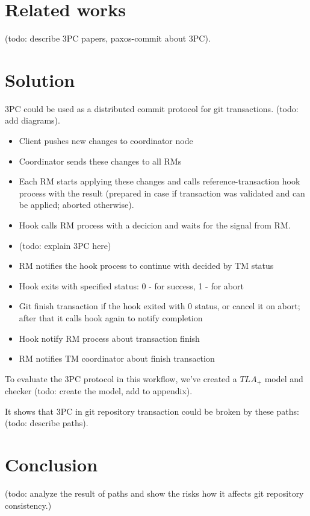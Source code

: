\documentclass[acmlarge, screen, nonacm]{acmart}
\begin{document}
\section{Related works}

(todo: describe 3PC papers, paxos-commit about 3PC).

\section{Solution}

3PC could be used as a distributed commit protocol for git transactions. (todo: add diagrams).
\begin{itemize}
  \item Client pushes new changes to coordinator node
  \item Coordinator sends these changes to all RMs
  \item Each RM starts applying these changes and calls reference-transaction hook process with the result (prepared
    in case if transaction was validated and can be applied; aborted otherwise).
  \item Hook calls RM process with a decicion and waits for the signal from RM.
  \item (todo: explain 3PC here)
  \item RM notifies the hook process to continue with decided by TM status
  \item Hook exits with specified status: 0 - for success, 1 - for abort
  \item Git finish transaction if the hook exited with 0 status, or cancel it on abort; after that it
    calls hook again to notify completion
  \item Hook notify RM process about transaction finish
  \item RM notifies TM coordinator about finish transaction
\end{itemize}

To evaluate the 3PC protocol in this workflow, we've created a $TLA_{+}$ model and checker
(todo: create the model, add to appendix).

It shows that 3PC in git repository transaction could be broken by these paths: (todo: describe paths).

\section{Conclusion}

(todo: analyze the result of paths and show the risks how it affects git repository consistency.)
\end{document}
